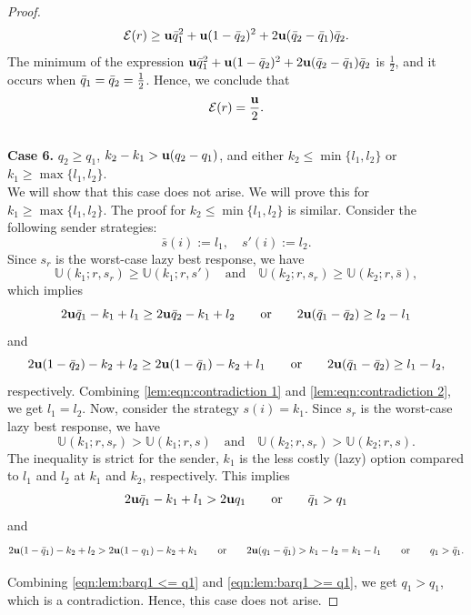 \begin{proof}
        \[
        \mathcal{E}(r) \geq \mathbf{u} \bar{q}_1^2 + \mathbf{u}(1 - \bar{q}_2)^2 + 2\mathbf{u}(\bar{q}_2 - \bar{q}_1)\bar{q}_2.
        \]
        The minimum of the expression $\mathbf{u} \bar{q}_1^2 + \mathbf{u}(1 - \bar{q}_2)^2 + 2\mathbf{u}(\bar{q}_2 - \bar{q}_1)\bar{q}_2$ is $\frac{1}{2}$, and it occurs when $\bar{q}_1 = \bar{q}_2 = \frac{1}{2}$. Hence, we conclude that
        \[
        \mathcal{E}(r) = \frac{\mathbf{u}}{2}.
        \]\\
\textbf{Case 6. }{$q_2 \geq q_1$, $k_2 - k_1 > \mathbf{u}(q_2 - q_1)$, and either $k_2 \leq \min\{l_1, l_2\}$ or $k_1 \geq \max\{l_1, l_2\}$.} \\
    We will show that this case does not arise. We will prove this for $k_1 \geq \max\{l_1, l_2\}$. The proof for $k_2 \leq \min\{l_1, l_2\}$ is similar.
Consider the following sender strategies:
    \[
    \bar{s}(i) := l_1, \quad s'(i) := l_2.
    \]
    Since $s_r$ is the worst-case lazy best response, we have
    \[
    \mathbb{U}(k_1; r, s_r) \geq \mathbb{U}(k_1; r, s') \quad \text{and} \quad \mathbb{U}(k_2; r, s_r) \geq \mathbb{U}(k_2; r, \bar{s}),
    \]
    which implies
    \begin{equation}\label{lem:eqn:contradiction 1}
        2\mathbf{u} \bar{q}_1 - k_1 + l_1 \geq 2\mathbf{u} \bar{q}_2 - k_1 + l_2 \quad \hbox{\quad or\quad} \quad 2\mathbf{u} (\bar{q}_1 - \bar{q}_2) \geq l_2 - l_1
    \end{equation}
    and
    \begin{equation}\label{lem:eqn:contradiction 2}
        2\mathbf{u} (1 - \bar{q}_2) - k_2 + l_2 \geq 2\mathbf{u} (1 - \bar{q}_1) - k_2 + l_1 \quad \hbox{\quad or\quad} \quad 2\mathbf{u} (\bar{q}_1 - \bar{q}_2) \geq l_1 - l_2,
    \end{equation}
    respectively.
Combining \eqref{lem:eqn:contradiction 1} and \eqref{lem:eqn:contradiction 2}, we get $l_1 = l_2$.
Now, consider the strategy $s(i) = k_1$. Since $s_r$ is the worst-case lazy best response, we have
    \[
    \mathbb{U}(k_1; r, s_r) > \mathbb{U}(k_1; r, s) \quad \text{and} \quad \mathbb{U}(k_2; r, s_r) > \mathbb{U}(k_2; r, s).
    \]
    The inequality is strict for the sender, $k_1$ is the less costly (lazy) option compared to $l_1$ and $l_2$ at $k_1$ and $k_2$, respectively. This implies
    \begin{equation}\label{eqn:lem:barq1 >= q1}
        2\mathbf{u} \bar{q}_1 - k_1 + l_1 > 2\mathbf{u} q_1 \quad \hbox{\quad or\quad} \quad \bar{q}_1 > q_1
    \end{equation}
    and
    \begin{equation}\label{eqn:lem:barq1 <= q1}
        2\mathbf{u} (1 - \bar{q}_1) - k_2 + l_2 > 2\mathbf{u} (1 - q_1) - k_2 + k_1 \quad \hbox{\quad or\quad} \quad 2\mathbf{u} (q_1 - \bar{q}_1) > k_1 - l_2 = k_1 - l_1 \quad \hbox{\quad or\quad} \quad q_1 > \bar{q}_1.
    \end{equation}

    Combining \eqref{eqn:lem:barq1 <= q1} and \eqref{eqn:lem:barq1 >= q1}, we get $q_1 > q_1$, which is a contradiction. Hence, this case does not arise.

\end{proof}